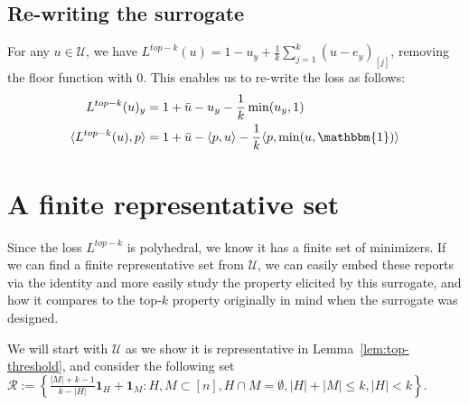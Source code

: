 \documentclass[12pt]{article}
\newcommand{\R}{\mathcal{R}}
\newcommand{\U}{\mathcal{U}}
\newcommand{\inprod}[2]{\langle #1, #2 \rangle}%
\newcommand{\ones}{\mathbbm{1}}
\begin{document}
\subsection{Re-writing the surrogate}
For any $u \in \U$, we have $L^{top-k}(u) =  1 - u_y + \frac 1 k \sum_{j = 1}^k(u - e_y)_{[j]}$, removing the floor function with $0$.
This enables us to re-write the loss as follows:
\begin{align*}
L^{top-k}(u)_y &= 1 + \bar u - u_y - \frac 1 k \min(u_y, 1)\\
\inprod{L^{top-k}(u)}{p} &= 1 + \bar u - \inprod{p}{u} - \frac 1 k \inprod{p}{\min(u, \ones)}
\end{align*}




\section{A finite representative set}
Since the loss $L^{top-k}$ is polyhedral, we know it has a finite set of minimizers.
If we can find a finite representative set from $\U$, we can easily embed these reports via the identity and more easily study the property elicited by this surrogate, and how it compares to the top-$k$ property originally in mind when the surrogate was designed.

We will start with $\U$ as we show it is representative in Lemma~\ref{lem:top-threshold}, and consider  the following set $\R := \left\{ \frac{|M| + k -1}{k - |H|} \mathbf{1}_H + \mathbf{1}_M : H, M \subset [n], H\cap M = \emptyset, |H| + |M| \leq k, |H| < k \right\}$.
\end{document}
